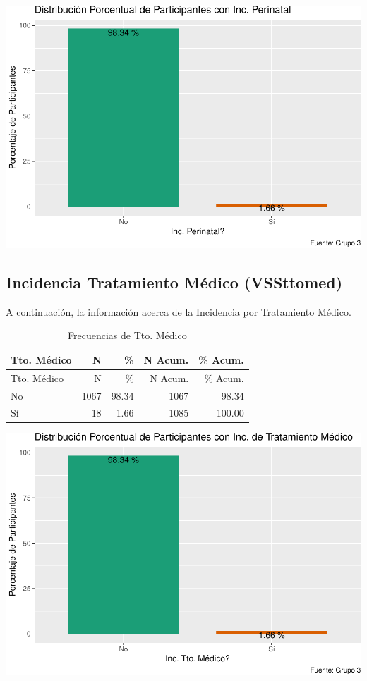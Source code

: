 \documentclass[
]{article}
\begin{document}
\includegraphics{Info_Dinix_02_files/figure-latex/30_VSSdesper-1.pdf}

\subsection{Incidencia Tratamiento Médico
(VSSttomed)}\label{incidencia-tratamiento-muxe9dico-vssttomed}

A continuación, la información acerca de la Incidencia por Tratamiento
Médico.

\begin{longtable}[]{@{}lrrrr@{}}
\caption{Frecuencias de Tto. Médico}\tabularnewline
\toprule\noalign{}
Tto. Médico & N & \% & N Acum. & \% Acum. \\
\midrule\noalign{}
\endfirsthead
\toprule\noalign{}
Tto. Médico & N & \% & N Acum. & \% Acum. \\
\midrule\noalign{}
\endhead
\bottomrule\noalign{}
\endlastfoot
No & 1067 & 98.34 & 1067 & 98.34 \\
Sí & 18 & 1.66 & 1085 & 100.00 \\
\end{longtable}

\includegraphics{Info_Dinix_02_files/figure-latex/30_VSSttomed-1.pdf}
\end{document}
